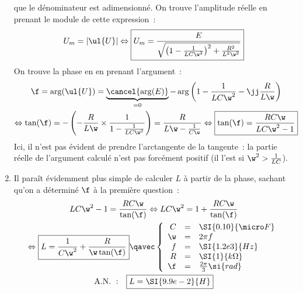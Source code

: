 \documentclass[a4paper, 12pt, final, garamond]{book}
\begin{document}
\begin{enumerate}
        que le dénominateur est adimensionné. \bigbreak
        On trouve l'amplitude réelle en prenant le module de cette expression~:
        \begin{gather*}
            U_m
                = \left| \ul{U} \right|
            \Leftrightarrow
            \boxed{U_m
                = \frac{E}{\sqrt{\left(1 - \frac{1}{LC\w^2}\right)^2 +
                \frac{R^2}{L^2\w^2}}}
            }
        \end{gather*}
        On trouve la phase en en prenant l'argument~:
        \begin{gather*}
            \f
                = \arg(\ul{U})
                = \underbrace{\cancel{\arg(E)}}_{=0}
                    - \arg \left( 1 - \frac{1}{LC\w^2} - \jj \frac{R}{L\w}
                    \right)\\
            \Leftrightarrow
            \tan(\f)
                = - \left(-\frac{R}{L\w}\times \frac{1}{1 - \frac{1}{LC\w^2}}\right)
                = \frac{R}{L\w - \frac{1}{C\w}}
            \Leftrightarrow
            \boxed{\tan(\f)
                = \frac{RC\w}{LC\w^2 - 1}
            }
        \end{gather*}
        Ici, il n'est pas évident de prendre l'arctangente de la tangente~: la
        partie réelle de l'argument calculé n'est pas forcément positif (il
        l'est si $\w^2 > \frac{1}{LC}$).
    \item Il paraît évidemment plus simple de calculer $L$ à partir de la phase,
        sachant qu'on a déterminé $\f$ à la première question~:
        \begin{gather*}
            LC\w^2 - 1
                = \frac{RC\w}{\tan(\f)}
            \Leftrightarrow
            LC\w^2 = 1 + \frac{RC\w}{\tan(\f)}\\
            \Leftrightarrow
            \boxed{L = \frac{1}{C\w^2} + \frac{R}{\w\tan(\f)}}
            \qavec
            \left\{
                \begin{array}{rcl}
                    C  & = & \SI{0.10}{\micro F}\\
                    \w & = & 2\pi f\\
                    f  & = & \SI{1.2e3}{Hz}\\
                    R  & = & \SI{1}{k\Omega}\\
                    \f & = & \frac{2\pi}{3}\si{rad}
                \end{array}
            \right.\\
            \mathrm{A.N.~:}\quad
            \boxed{L = \SI{9.9e-2}{H}}
        \end{gather*}
\end{enumerate}
\end{document}
